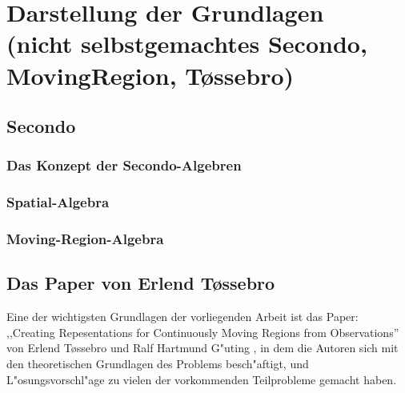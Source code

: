 
\chapter[Darstellung der Grundlagen \anmerkung{30-40 Seiten}]{Darstellung der Grundlagen\\
\normalsize{(nicht selbstgemachtes
Secondo,
MovingRegion,
T\o{}ssebro)}} \label{Kapitel2}
\minitoc
\newpage
\section{Secondo }
\subsection{Das Konzept der Secondo-Algebren}
\subsection{Spatial-Algebra}
\subsection{Moving-Region-Algebra}

\section{Das Paper von Erlend T\o{}ssebro }

Eine der wichtigsten Grundlagen der vorliegenden Arbeit ist das Paper: ,,Creating Repesentations for Continuously Moving Regions from Observations'' \cite{TG} von Erlend T\o{}ssebro und Ralf Hartmund G"uting \cite{TG}, in dem die Autoren sich mit den theoretischen Grundlagen des Problems besch"aftigt, und L"osungsvorschl"age zu vielen der vorkommenden Teilprobleme gemacht haben.

